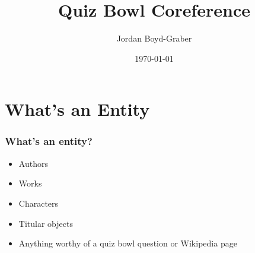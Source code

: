 \documentclass[compress]{beamer}
\title{Quiz Bowl Coreference}
\author{Jordan Boyd-Graber}
\date{\today}
\begin{document}


\section{What's an Entity}

\begin{frame}
  \frametitle{What's an entity?}

  \begin{itemize}
    \item Authors
    \item Works
    \item Characters
    \item Titular objects
    \pause
    \item Anything worthy of a quiz bowl question or Wikipedia page
  \end{itemize}

\end{frame}
\end{document}
